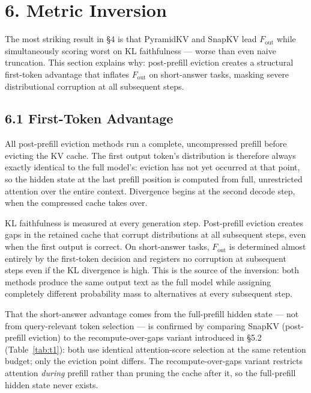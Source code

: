\documentclass[10pt,letterpaper]{article}
\begin{document}
\hypertarget{metric-inversion}{%
\section{6. Metric Inversion}\label{metric-inversion}}

The most striking result in §4 is that PyramidKV and SnapKV lead
\(F_{\text{out}}\) while simultaneously scoring worst on KL faithfulness
--- worse than even naive truncation. This section explains why: post-prefill
eviction creates a structural first-token advantage that inflates
\(F_{\text{out}}\) on short-answer tasks, masking severe distributional
corruption at all subsequent steps.

\hypertarget{first-token-advantage}{%
\subsection{6.1 First-Token Advantage}\label{first-token-advantage}}

All post-prefill eviction methods
run a complete, uncompressed prefill before evicting the KV cache. The
first output token's distribution is therefore always exactly identical
to the full model's: eviction has not yet occurred at that point, so the
hidden state at the last prefill position is computed from full,
unrestricted attention over the entire context. Divergence begins at the
second decode step, when the compressed cache takes over. 

KL faithfulness is measured at every generation step. Post-prefill
eviction creates gaps in the retained cache that corrupt distributions
at all subsequent steps, even when the first output is correct. On
short-answer tasks, \(F_{\text{out}}\) is determined almost entirely by
the first-token decision and registers no corruption at subsequent
steps even if the KL divergence is high. This is the source of the 
inversion: both methods produce the
same output text as the full model while assigning completely different
probability mass to alternatives at every subsequent step.

That the short-answer advantage comes
from the full-prefill hidden state --- not from query-relevant token
selection --- is confirmed by comparing SnapKV
(post-prefill eviction) to the recompute-over-gaps variant
introduced in §5.2 (Table~\ref{tab:t1}): both use identical
attention-score selection at the same retention budget; only the
eviction point differs. The recompute-over-gaps variant restricts
attention \emph{during} prefill rather than pruning the cache after it,
so the full-prefill hidden state never exists. 
\end{document}
